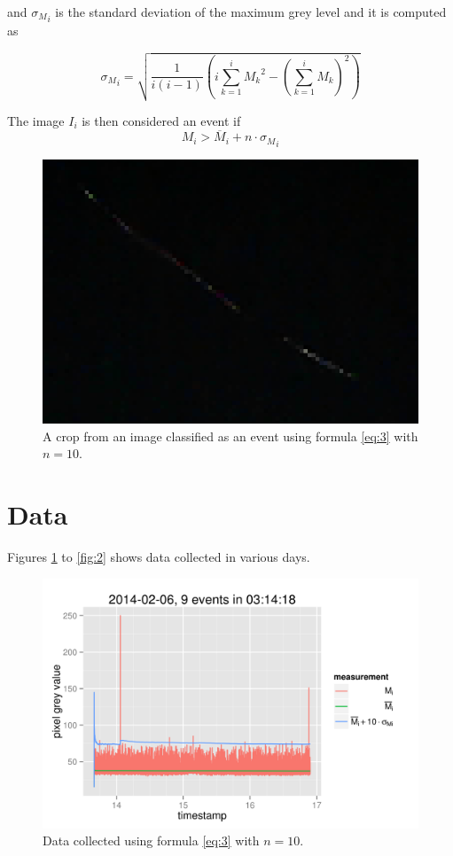 \documentclass[a4paper,12pt]{article}
\begin{document}
 and ${\sigma_{M}}_{i}$ is the standard deviation of the maximum grey level and it is computed as

 $${\sigma_{M}}_{i}=\sqrt{\frac{1}{i(i-1)}\left(i\sum_{k=1}^i {M_k}^2-\left(\sum_{k=1}^i M_k\right)^2\right)}$$


The image $I_i$ is then considered an event if 
\begin{equation}
M_i>\overline{M}_i+n\cdot{\sigma_{M}}_{i}\label{eq:3}
\end{equation}

\begin{figure}[h!]
  \centering
  \includegraphics[scale=0.5]{bella.png}
  \caption{A crop from an image classified as an event using formula \ref{eq:3} with $n=10$.}
\end{figure}

\section{Data}
Figures \ref{fig:1} to \ref{fig:2} shows data collected in various days.

\begin{figure}[h!]
  \centering
  \includegraphics{20140206.png}
  \caption{Data collected using formula \ref{eq:3} with $n=10$.}\label{fig:1}
\end{figure}
\end{document}
